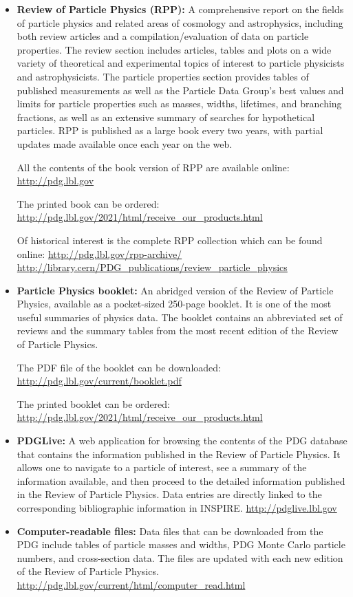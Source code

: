 \begin{itemize}
\item
  \textbf{Review of Particle Physics (RPP):} A comprehensive report on
  the fields of particle physics and related areas of cosmology and
  astrophysics, including both review articles and a
  compilation/evaluation of data on particle properties. The review
  section includes articles, tables and plots on a wide variety of
  theoretical and experimental topics of interest to particle physicists
  and astrophysicists. The particle properties section provides tables
  of published measurements as well as the Particle Data Group's best
  values and limits for particle properties such as masses, widths,
  lifetimes, and branching fractions, as well as an extensive summary of
  searches for hypothetical particles. RPP is published as a large book
  every two years, with partial updates made available once each year on
  the web.

  All the contents of the book version of RPP are available online:
  \url{http://pdg.lbl.gov}

  The printed book can be ordered:
  \url{http://pdg.lbl.gov/2021/html/receive_our_products.html}

  Of historical interest is the complete RPP collection which can be
  found online: \url{http://pdg.lbl.gov/rpp-archive/}
  \url{http://library.cern/PDG_publications/review_particle_physics}
\item
  \textbf{Particle Physics booklet:} An abridged version of the Review
  of Particle Physics, available as a pocket-sized 250-page booklet. It
  is one of the most useful summaries of physics data. The booklet
  contains an abbreviated set of reviews and the summary tables from the
  most recent edition of the Review of Particle Physics.

  The PDF file of the booklet can be downloaded:
  \url{http://pdg.lbl.gov/current/booklet.pdf}

  The printed booklet can be ordered:
  \url{http://pdg.lbl.gov/2021/html/receive_our_products.html}
\item
{}
  \textbf{PDGLive:} A web application for browsing the contents of the
  PDG database that contains the information published in the Review of
  Particle Physics. It allows one to navigate to a particle of interest,
  see a summary of the information available, and then proceed to the
  detailed information published in the Review of Particle Physics. Data
  entries are directly linked to the corresponding bibliographic
  information in INSPIRE. \url{http://pdglive.lbl.gov}
\item
{}
  \textbf{Computer-readable files:} Data files that can be downloaded
  from the PDG include tables of particle masses and widths, PDG Monte
  Carlo particle numbers, and cross-section data. The files are updated
  with each new edition of the Review of Particle Physics.
  \url{http://pdg.lbl.gov/current/html/computer_read.html}
\end{itemize}

